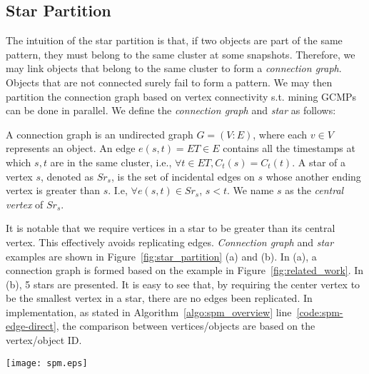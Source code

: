 \subsection{Star Partition}
The intuition of the star partition is that, if two objects are part 
of the same pattern, they must belong to the same cluster at 
some snapshots. Therefore, we may link objects that belong to the same cluster to form a \emph{connection graph}. Objects that are
not connected surely fail to form a pattern. We may then
partition the connection graph based on vertex connectivity
s.t. mining GCMPs can be done in parallel. We define the \emph{connection graph} and \emph{star}
as follows:
\begin{definition}
A connection graph is an undirected graph $G=(V:E)$, where 
each $v \in V$ represents an object. An edge $e(s,t)= ET \in E$ 
contains all the timestamps at which $s,t$ are in the same cluster,
i.e., $\forall t \in ET, C_t(s) = C_t(t)$. 
A star of a vertex $s$, denoted as $Sr_s$, is the set of incidental edges on $s$ whose
another ending vertex is greater than $s$. I.e, $\forall e(s,t) \in Sr_s$, $s < t$. We name $s$
as the \emph{central vertex} of $Sr_s$.
\end{definition}

It is notable that we require vertices in a star to be greater than its central vertex. This 
effectively avoids replicating edges. \emph{Connection graph} and \emph{star} examples are 
shown in Figure~\ref{fig:star_partition} (a) and (b). In (a), a connection graph is formed
based on the example in Figure~\ref{fig:related_work}.
In (b), 5 stars are presented. It is easy to see that, by requiring the center vertex to be
the smallest vertex in a star, there are no edges been replicated. In implementation,
as stated in Algorithm~\ref{algo:spm_overview} line~\ref{code:spm-edge-direct}, the
comparison between vertices/objects are based on the vertex/object ID.

\begin{figure*}[t]
\centering
\texttt{[image: spm.eps]}
\caption{Star partition and mining. (a) Conceptual connection graph from Figure 1.(b) Five star partitions are generated
(c) Apriori Mining with various pruning techniques.}
\label{fig:star_partition}
\end{figure*}

